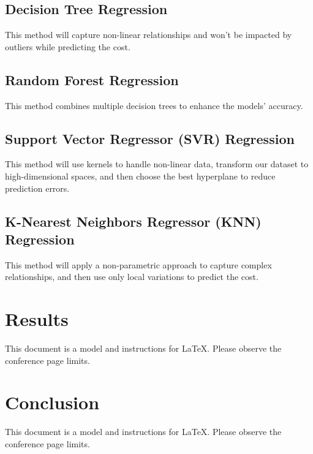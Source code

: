 \documentclass[conference]{IEEEtran}
\begin{document}
\subsection{Decision Tree Regression}
This method will capture non-linear relationships and won't be impacted by outliers while predicting the cost. 

\subsection{Random Forest Regression}
This method combines multiple decision trees to enhance the models' accuracy.  

\subsection{Support Vector Regressor (SVR) Regression}
This method will use kernels to handle non-linear data, transform our dataset to high-dimensional spaces, and then choose the best hyperplane to reduce prediction errors. 

\subsection{K-Nearest Neighbors Regressor (KNN) Regression}
This method will apply a non-parametric approach to capture complex relationships, and then use only local variations to predict the cost. 


\section{Results}
This document is a model and instructions for \LaTeX.
Please observe the conference page limits. 

\section{Conclusion}
This document is a model and instructions for \LaTeX.
Please observe the conference page limits. 
\end{document}

